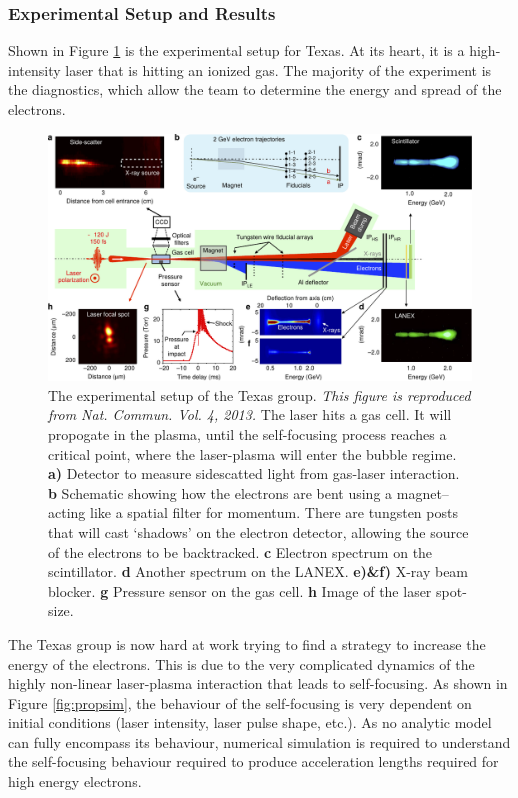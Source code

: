 \documentclass[12pt,letter]{article}
\begin{document}
\subsubsection{Experimental Setup and Results}
Shown in Figure \ref{fig:experTexas} is the experimental setup for Texas. At
its heart, it is a high-intensity laser that is hitting an ionized gas. The
majority of the experiment is the diagnostics, which allow the team to determine
the energy and spread of the electrons.
\begin{figure}[b!]
	\includegraphics[width=\textwidth]{../figures/texasexplayout.pdf}
    \caption{\small The experimental setup of the Texas group.\cite{Wang2013}
        {\em This
        figure is reproduced from Nat. Commun. Vol. 4, 2013. } The laser hits
            a gas cell. It will propogate in the plasma, until the self-focusing
            process reaches a critical point, where the laser-plasma will enter
            the bubble regime. \textbf{a)} Detector to measure sidescatted light
            from gas-laser interaction. \textbf{b} Schematic showing how the
            electrons are bent using a magnet-- acting like a spatial filter for
            momentum. There are tungsten posts that will cast `shadows' on the
            electron detector, allowing the source of the electrons to be
            backtracked. \textbf{c} Electron spectrum on the scintillator.
            \textbf{d} Another spectrum on the LANEX. \textbf{e)\&f)} X-ray beam
            blocker. \textbf{g} Pressure sensor on the gas cell. \textbf{h}
            Image of the laser spot-size.
        \label{fig:experTexas} }
    
\end{figure}

The Texas group is now hard at work trying to find a strategy to increase the
energy of the electrons. This is due to the very complicated dynamics of the
highly non-linear laser-plasma interaction that leads to self-focusing. As
shown in Figure \ref{fig:propsim}, the behaviour of the self-focusing is very
dependent on initial conditions (laser intensity, laser pulse shape, etc.). As
no analytic model can fully encompass its behaviour, numerical simulation is
required to understand the self-focusing behaviour required to produce
acceleration lengths required for high energy electrons.
\end{document}

